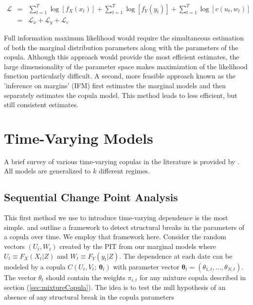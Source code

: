 \documentclass[12pt]{article}
\newcommand{\Lagr}{\mathcal{L}}
\begin{document}
\begin{eqnarray*}
\Lagr &=& \sum\nolimits_{t=1}^{T}\log \left[f_{X}\left(x_{t}\right)\right] + \sum\nolimits_{t=1}^{T}\log \left[f_{Y}\left(y_{t}\right)\right]
+ \sum\nolimits_{t=1}^{T}\log \left[c\left(u_{t}, w_{t}\right)\right] \\
    &=& \Lagr_{x} + \Lagr_{y} + \Lagr_{c}
\end{eqnarray*}

Full information maximum likelihood would require the simultaneous estimation of both the marginal distribution parameters along with the parameters of the copula. Although this approach would provide the most efficient estimates, the large dimensionality of the parameter space makes maximization of the likelihood function particularly difficult. A second, more feasible approach known as the 'inference on margins' (IFM) first estimates the marginal models and then separately estimates the copula model. This method leads to less efficient, but still consistent estimates.

\section{Time-Varying Models} \label{sec:time_varying_models}

A brief survey of various time-varying copulas in the literature is provided by \cite{Manner_and_Reznikova_2012}. All models are generalized to $k$ different regimes.

\subsection{Sequential Change Point Analysis}

This first method we use to introduce time-varying dependence is the most simple. \cite{Dias_and_Embrechts_2004} and \cite{Dias_and_Embrechts_2009} outline a framework to detect structural breaks in the parameters of a copula over time. We employ that framework here. Consider the random vectors $\left(U_{t}, W_{t}\right)$ created by the PIT from our marginal models where $U_{t}\equiv F_{X}\left(X_{t}|Z\right)$ and $W_{t}\equiv F_{Y}\left(y_{t} | Z\right)$. The dependence at each date can be modeled by a copula $C\left(U_{t}, V_{t};~\boldsymbol{\theta}_{t}\right)$ with parameter vector $\boldsymbol{\theta}_{t}=(\theta_{1,t},...,\theta_{N,t})$. The vector $\theta_{t}$ should contain the weights $\pi _{i,t}$ for any mixture copula described in section (\ref{sec:mixtureCopula}). The idea is to test the null hypothesis of an absence of any structural break in the copula parameters
\end{document}
